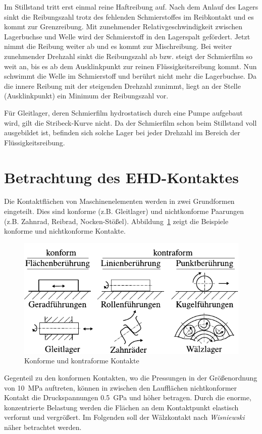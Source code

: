 Im Stillstand tritt erst einmal reine Haftreibung auf.
Nach dem Anlauf des Lagers sinkt die Reibungszahl trotz des fehlenden Schmierstoffes im Reibkontakt und es kommt zur Grenzreibung.
Mit zunehmender Relativgeschwindigkeit zwischen Lagerbuchse und Welle wird der Schmierstoff in den Lagerspalt gefördert.
Jetzt nimmt die Reibung weiter ab und es kommt zur Mischreibung.
Bei weiter zunehmender Drehzahl sinkt die Reibungszahl ab bzw. steigt der Schmierfilm so weit an, bis es ab dem Ausklinkpunkt zur reinen Flüssigkeitsreibung kommt.
Nun schwimmt die Welle im Schmierstoff und berührt nicht mehr die Lagerbuchse.
Da die innere Reibung mit der steigenden Drehzahl zunimmt, liegt an der Stelle (Ausklinkpunkt) ein Minimum der Reibungszahl vor.

Für Gleitlager, deren Schmierfilm hydrostatisch durch eine Pumpe aufgebaut wird, gilt die Stribeck-Kurve nicht.
Da der Schmierfilm schon beim Stillstand voll ausgebildet ist, befinden sich solche Lager bei jeder Drehzahl im Bereich der Flüssigkeitsreibung.

\section{Betrachtung des EHD-Kontaktes}
\label{sec:betrachtung_des_ehd_kontaktes}

Die Kontaktflächen von Maschinenelementen werden in zwei Grundformen eingeteilt.
Dies sind konforme (z.B. Gleitlager) und nichtkonforme Paarungen (z.B. Zahnrad, Reibrad, Nocken-Stößel).
Abbildung~\ref{fig:konforme_kontraforme_kontakte} zeigt die Beispiele konforme und nichtkonforme Kontakte.
\begin{figure}[htb]
    \centering
    \includegraphics[]{./images/konforme_kontraforme_kontakte.pdf}
    \caption{Konforme und kontraforme Kontakte \cite{steinhilper_2008}}
    \label{fig:konforme_kontraforme_kontakte}
\end{figure}
%
Gegenteil zu den konformen Kontakten, wo die Pressungen in der Größenordnung von \SI{10}{\mega\pascal} auftreten, können in zwischen den Laufflächen nichtkonformer Kontakt die Druckspannungen \SI{0.5}{\giga\pascal} und höher betragen.
Durch die enorme, konzentrierte Belastung werden die Flächen an dem Kontaktpunkt elastisch verformt und vergrößert.
Im Folgenden soll der Wälzkontakt nach \textit{Wisniewski} \cite{wisniewski_2000} näher betrachtet werden.

